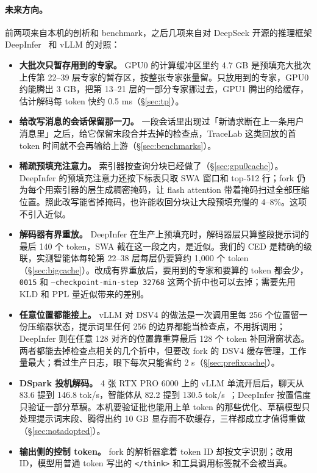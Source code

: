 \documentclass[11pt,a4paper]{article}
\newcommand{\code}[1]{\texttt{#1}}
\newcommand{\tps}{tok/s}
\begin{document}
\paragraph{未来方向。} 前两项来自本机的剖析和 benchmark，之后几项来自对 DeepSeek 开源的推理框架 DeepInfer~\cite{deepinfer} 和 vLLM 的对照：
\begin{itemize}
  \item \textbf{大批次只暂存用到的专家。} GPU0 的计算缓冲区里约 4.7 GB 是预填充大批次上传第 22--39 层专家的暂存区，按整张专家张量留。只放用到的专家，GPU0 约能腾出 3 GB，把第 13--21 层的一部分专家挪过去，GPU1 腾出的给缓存，估计解码每 token 快约 0.5 ms（\S\ref{sec:tp}）。
  \item \textbf{给改写消息的会话保留那一刀。} 一段会话里出现过「新请求断在上一条用户消息里」之后，给它保留末段合并去掉的检查点，TraceLab 这类回放的首 token 时间就不会再输给上游（\S\ref{sec:benchmarks}）。
  \item \textbf{稀疏预填充注意力。} 索引器按查询分块已经做了（\S\ref{sec:gpu0cache}）。DeepInfer 的预填充注意力还按下标表只取 SWA 窗口和 top-512 行；fork 仍为每个用索引器的层生成稠密掩码，让 flash attention 带着掩码扫过全部压缩位置。照此改写能省掉掩码，也许能收回分块让大段预填充慢的 4--8\%。这项不引入近似。
  \item \textbf{解码器有界重放。} DeepInfer 在生产上预填充时，解码器层只算整段提示词的最后 140 个 token，SWA 截在这一段之内，是近似。我们的 CED 是精确的级联，实测智能体每轮第 22--38 层每层仍要算约 1,000 个 token（\S\ref{sec:bigcache}）。改成有界重放后，要用到的专家和要算的 token 都会少，\code{0015} 和 \code{--checkpoint-min-step 32768} 这两个折中也可以去掉；需要先用 KLD 和 PPL 量近似带来的差别。
  \item \textbf{任意位置都能接上。} vLLM 对 DSV4 的做法是一次调用里每 256 个位置留一份压缩器状态，提示词里任何 256 的边界都能当检查点，不用拆调用；DeepInfer 则在任意 128 对齐的位置靠重算最后 128 个 token 补回滑窗状态。两者都能去掉检查点相关的几个折中，但要改 fork 的 DSV4 缓存管理，工作量最大；看过生产日志，眼下每次只能省约 2 s（\S\ref{sec:prefixcache}）。
  \item \textbf{DSpark 投机解码。} 4 张 RTX PRO 6000 上的 vLLM 单流开启后，聊天从 83.6 提到 146.8 \tps{}，智能体从 82.2 提到 130.5 \tps{}~\cite{infatoshi}；DeepInfer 按置信度只验证一部分草稿。本机要验证批也能用上单 token 的那些优化、草稿模型只处理提示词末段、腾得出约 10 GB 显存而不砍缓存，三样都成立才值得重做（\S\ref{sec:notadopted}）。
  \item \textbf{输出侧的控制 token。} fork 的解析器拿着 token ID 却按文字识别；改用 ID，模型用普通 token 写出的 \code{</think>} 和工具调用标签就不会被当真。
\end{itemize}
\end{document}
